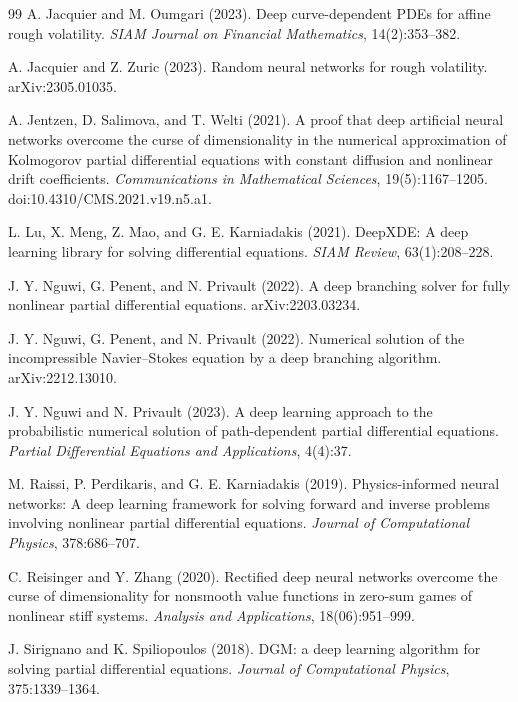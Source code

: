 \documentclass[11pt]{article}
\theoremstyle{definition}
\theoremstyle{plain}
\begin{document}
\begin{appendices}
\begin{thebibliography}{99}
 A. Jacquier and M. Oumgari (2023). \newblock Deep curve-dependent PDEs for affine rough volatility. \newblock \emph{SIAM Journal on Financial Mathematics}, 14(2):353--382.

 A. Jacquier and Z. Zuric (2023). \newblock Random neural networks for rough volatility. \newblock arXiv:2305.01035.

 A. Jentzen, D. Salimova, and T. Welti (2021). \newblock A proof that deep artificial neural networks overcome the curse of dimensionality in the numerical approximation of Kolmogorov partial differential equations with constant diffusion and nonlinear drift coefficients. \newblock \emph{Communications in Mathematical Sciences}, 19(5):1167--1205. doi:10.4310/CMS.2021.v19.n5.a1.

 L. Lu, X. Meng, Z. Mao, and G. E. Karniadakis (2021). \newblock DeepXDE: A deep learning library for solving differential equations. \newblock \emph{SIAM Review}, 63(1):208--228.

 J. Y. Nguwi, G. Penent, and N. Privault (2022). \newblock A deep branching solver for fully nonlinear partial differential equations. \newblock arXiv:2203.03234.

 J. Y. Nguwi, G. Penent, and N. Privault (2022). \newblock Numerical solution of the incompressible Navier--Stokes equation by a deep branching algorithm. \newblock arXiv:2212.13010.

 J. Y. Nguwi and N. Privault (2023). \newblock A deep learning approach to the probabilistic numerical solution of path-dependent partial differential equations. \newblock \emph{Partial Differential Equations and Applications}, 4(4):37.

 M. Raissi, P. Perdikaris, and G. E. Karniadakis (2019). \newblock Physics-informed neural networks: A deep learning framework for solving forward and inverse problems involving nonlinear partial differential equations. \newblock \emph{Journal of Computational Physics}, 378:686--707.

 C. Reisinger and Y. Zhang (2020). \newblock Rectified deep neural networks overcome the curse of dimensionality for nonsmooth value functions in zero-sum games of nonlinear stiff systems. \newblock \emph{Analysis and Applications}, 18(06):951--999.

 J. Sirignano and K. Spiliopoulos (2018). \newblock DGM: a deep learning algorithm for solving partial differential equations. \newblock \emph{Journal of Computational Physics}, 375:1339--1364.


\end{thebibliography}
\end{appendices}
\end{document}
